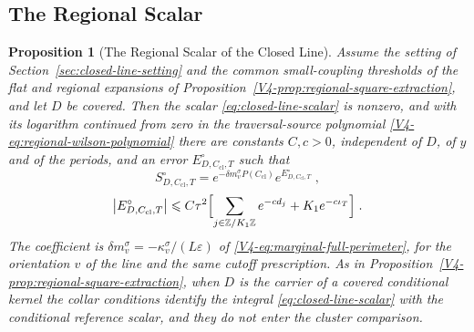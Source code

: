 \documentclass[11pt]{article}
\numberwithin{equation}{section}
\newtheorem{proposition}[theorem]{Proposition}
\theoremstyle{remark}
\theoremstyle{plain}
\begin{document}
\subsection{The Regional Scalar}\label{sec:closed-line-regional}

\begin{proposition}[The Regional Scalar of the Closed Line]\label{prop:closed-line-scalar}
Assume the setting of Section~\ref{sec:closed-line-setting} and the common small-coupling thresholds of the flat and regional expansions of Proposition~\ref{V4-prop:regional-square-extraction}, and let $D$ be covered. Then the scalar \eqref{eq:closed-line-scalar} is nonzero, and with its logarithm continued from zero in the traversal-source polynomial \eqref{V4-eq:regional-wilson-polynomial} there are constants $C,c>0$, independent of $D$, of $y$ and of the periods, and an error $E^{\circ}_{D,C_{\mathrm{cl}},T}$ such that
\begin{equation}\label{eq:closed-line-extraction}
    S^{\circ}_{D,C_{\mathrm{cl}},T}= e^{-\delta m^{\sigma}_v P(C_{\mathrm{cl}})}e^{E^{\circ}_{D,C_{\mathrm{cl}},T}}\;,
\end{equation}
\begin{equation}\label{eq:closed-line-error}
    \bigl| E^{\circ}_{D,C_{\mathrm{cl}},T}\bigr|\leqslant C\tau^2\Bigl[\sum_{j\in\mathbb Z/K_1\mathbb Z}e^{-cd_j}+K_1e^{-c\iota_T}\Bigr]\;.
\end{equation}
The coefficient is $\delta m^{\sigma}_v=-\kappa^{\sigma}_v/(L\varepsilon)$ of \eqref{V4-eq:marginal-full-perimeter}, for the orientation $v$ of the line and the same cutoff prescription. As in Proposition~\ref{V4-prop:regional-square-extraction}, when $D$ is the carrier of a covered conditional kernel the collar conditions identify the integral \eqref{eq:closed-line-scalar} with the conditional reference scalar, and they do not enter the cluster comparison.
\end{proposition}
\end{document}

